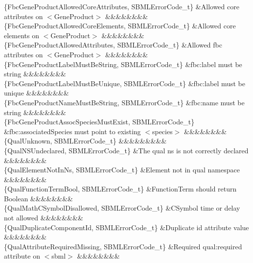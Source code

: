 \begin{DoxyParagraph}{}
\begin{longtabu}
\{Fbc\+Gene\+Product\+Allowed\+Core\+Attributes, S\+B\+M\+L\+Error\+Code\+\_\+t\} &Allowed core attributes on {\ttfamily $<$Gene\+Product$>$} &&&&&&&&\\
\{Fbc\+Gene\+Product\+Allowed\+Core\+Elements, S\+B\+M\+L\+Error\+Code\+\_\+t\} &Allowed core elements on {\ttfamily $<$Gene\+Product$>$} &&&&&&&&\\
\{Fbc\+Gene\+Product\+Allowed\+Attributes, S\+B\+M\+L\+Error\+Code\+\_\+t\} &Allowed fbc attributes on {\ttfamily $<$Gene\+Product$>$} &&&&&&&&\\
\{Fbc\+Gene\+Product\+Label\+Must\+Be\+String, S\+B\+M\+L\+Error\+Code\+\_\+t\} &\textquotesingle{}fbc\+:label\textquotesingle{} must be string &&&&&&&&\\
\{Fbc\+Gene\+Product\+Label\+Must\+Be\+Unique, S\+B\+M\+L\+Error\+Code\+\_\+t\} &\textquotesingle{}fbc\+:label\textquotesingle{} must be unique &&&&&&&&\\
\{Fbc\+Gene\+Product\+Name\+Must\+Be\+String, S\+B\+M\+L\+Error\+Code\+\_\+t\} &\textquotesingle{}fbc\+:name\textquotesingle{} must be string &&&&&&&&\\
\{Fbc\+Gene\+Product\+Assoc\+Species\+Must\+Exist, S\+B\+M\+L\+Error\+Code\+\_\+t\} &\textquotesingle{}fbc\+:associated\+Species\textquotesingle{} must point to existing {\ttfamily $<$species$>$} &&&&&&&&\\
\{Qual\+Unknown, S\+B\+M\+L\+Error\+Code\+\_\+t\} &&&&&&&&&\\
\{Qual\+N\+S\+Undeclared, S\+B\+M\+L\+Error\+Code\+\_\+t\} &The qual ns is not correctly declared &&&&&&&&\\
\{Qual\+Element\+Not\+In\+Ns, S\+B\+M\+L\+Error\+Code\+\_\+t\} &Element not in qual namespace &&&&&&&&\\
\{Qual\+Function\+Term\+Bool, S\+B\+M\+L\+Error\+Code\+\_\+t\} &Function\+Term should return Boolean &&&&&&&&\\
\{Qual\+Math\+C\+Symbol\+Disallowed, S\+B\+M\+L\+Error\+Code\+\_\+t\} &C\+Symbol time or delay not allowed &&&&&&&&\\
\{Qual\+Duplicate\+Component\+Id, S\+B\+M\+L\+Error\+Code\+\_\+t\} &Duplicate \textquotesingle{}id\textquotesingle{} attribute value &&&&&&&&\\
\{Qual\+Attribute\+Required\+Missing, S\+B\+M\+L\+Error\+Code\+\_\+t\} &Required qual\+:required attribute on {\ttfamily $<$sbml$>$} &&&&&&&&\\

\end{longtabu}
\end{DoxyParagraph}
